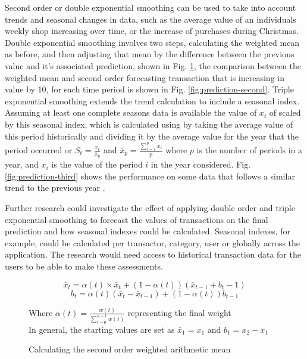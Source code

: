 Second order or double exponential smoothing can be used to take into account trends and seasonal changes in data, such as the average value of an individuals weekly shop increasing over time, or the increase of purchases during Christmas. 
%
Double exponential smoothing involves two steps, calculating the weighted mean as before, and then adjusting that mean by the difference between the previous value and it's associated prediction, shown in Fig. \ref{fig:second-order-math}, the comparison between the weighted mean and second order forecasting transaction that is increasing in value by 10, for each time period is shown in Fig. \ref{fig:prediction-second}. 
%
Triple exponential smoothing extends the trend calculation to include a seasonal index. Assuming at least one complete seasons data is available the value of $x_t$ of scaled by this seasonal index, which is calculated using by taking the average value of this period historically and dividing it by the average value for the year that the period occurred or $S_{t} = \frac{x_t}{\bar{x}_p}$ and $\bar{x}_p = \frac{\sum_{i=1}^{p} x_i}{p}$ where $p$ is the number of periods in a year, and $x_i$ is the value of the period $i$ in the year considered. Fig. \ref{fig:prediction-third} shows the performance on some data that follows a similar trend to the previous year \parencite{kalekar2004holtwinters,dash2012movingaverages}.

Further research could investigate the effect of applying double order and triple exponential smoothing to forecast the values of transactions on the final prediction and how seasonal indexes could be calculated. Seasonal indexes, for example, could be calculated per transactor, category, user or globally across the application. The research would need access to historical transaction data for the users to be able to make these assessments.

\begin{figure}
\centering
\[\bar{x}_t = \alpha(t) \times \bar{x}_t + (1 - \alpha(t))(\bar{x}_{t-1} + b_t-1)\]
\[b_t = \alpha(t)(\bar{x}_t - \bar{x}_{t-1}) + (1 - \alpha(t))b_{t-1}\]

Where $\alpha(t) = \frac{w(t)}{\sum_{t=0}^{n-1}{w(t)}}$ representing the final weight\\
In general, the starting values are set as $\bar{x}_1 = x_1$ and $b_1 = x_2 - x_1$

\caption{Calculating the second order weighted arithmetic mean}
\label{fig:second-order-math}
\end{figure}

